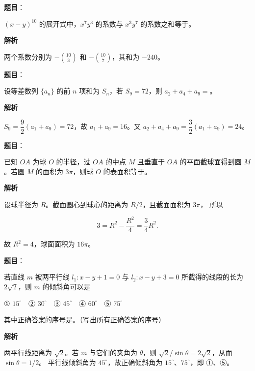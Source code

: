\begin{answer}

\textbf{题目}：

$(x-y)^{10}$ 的展开式中，$x^7y^3$ 的系数与 $x^3y^7$ 的系数之和等于\gkblank{}。

\textbf{解析}

两个系数分别为 $-\binom{10}{3}$ 和 $-\binom{10}{7}$，其和为 $-240$。


\end{answer}
\begin{answer}

\textbf{题目}：

设等差数列 $\{a_n\}$ 的前 $n$ 项和为 $S_n$，若 $S_9=72$，则 $a_2+a_4+a_9=$\gkblank{}。

\textbf{解析}

$S_9=\dfrac92(a_1+a_9)=72$，故 $a_1+a_9=16$。又
$a_2+a_4+a_9=\dfrac32(a_1+a_9)=24$。


\end{answer}
\begin{answer}

\textbf{题目}：

已知 $OA$ 为球 $O$ 的半径，过 $OA$ 的中点 $M$ 且垂直于 $OA$ 的平面截球面得到圆 $M$。若圆 $M$ 的面积为 $3\pi$，则球 $O$ 的表面积等于\gkblank{}。

\textbf{解析}

设球半径为 $R$。截面圆心到球心的距离为 $R/2$，且截面面积为 $3\pi$，
所以

\nopagebreak[4]
\[
3=R^2-\frac{R^2}{4}=\frac34R^2.
\]

故 $R^2=4$，球面面积为 $16\pi$。


\end{answer}
\begin{answer}

\textbf{题目}：

若直线 $m$ 被两平行线 $l_1:x-y+1=0$ 与 $l_2:x-y+3=0$ 所截得的线段的长为 $2\sqrt2$，则 $m$ 的倾斜角可以是

① $15^\circ$　② $30^\circ$　③ $45^\circ$　④ $60^\circ$　⑤ $75^\circ$

其中正确答案的序号是\gkblank{}。（写出所有正确答案的序号）

\textbf{解析}

两平行线距离为 $\sqrt2$。若 $m$ 与它们的夹角为 $\theta$，则
$\sqrt2/\sin\theta=2\sqrt2$，从而 $\sin\theta=1/2$。
平行线倾斜角为 $45^\circ$，故正确倾斜角为 $15^\circ\text{、}75^\circ$，即
①、⑤。


\end{answer}
